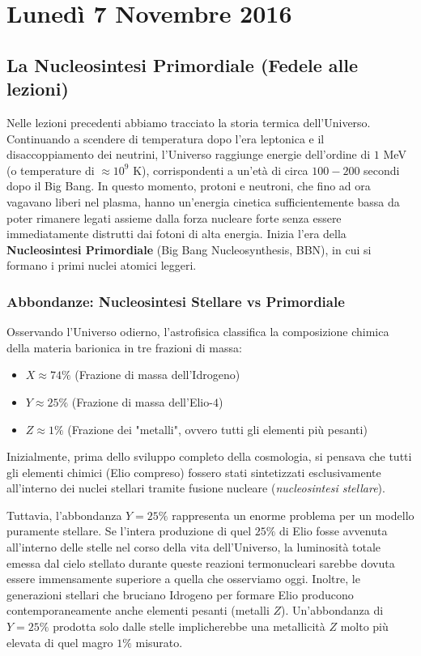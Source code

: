 \documentclass[11pt,a4paper]{report}
\begin{document}
\chapter{Lunedì 7 Novembre 2016}

\section{La Nucleosintesi Primordiale (Fedele alle lezioni)}

Nelle lezioni precedenti abbiamo tracciato la storia termica dell'Universo. Continuando a scendere di temperatura dopo l'era leptonica e il disaccoppiamento dei neutrini, l'Universo raggiunge energie dell'ordine di $1$ MeV (o temperature di $\approx 10^9$ K), corrispondenti a un'età di circa $100-200$ secondi dopo il Big Bang. 
In questo momento, protoni e neutroni, che fino ad ora vagavano liberi nel plasma, hanno un'energia cinetica sufficientemente bassa da poter rimanere legati assieme dalla forza nucleare forte senza essere immediatamente distrutti dai fotoni di alta energia. Inizia l'era della \textbf{Nucleosintesi Primordiale} (Big Bang Nucleosynthesis, BBN), in cui si formano i primi nuclei atomici leggeri.

\subsection{Abbondanze: Nucleosintesi Stellare vs Primordiale}
Osservando l'Universo odierno, l'astrofisica classifica la composizione chimica della materia barionica in tre frazioni di massa:
\begin{itemize}
    \item $X \approx 74\%$ (Frazione di massa dell'Idrogeno)
    \item $Y \approx 25\%$ (Frazione di massa dell'Elio-$4$)
    \item $Z \approx 1\%$ (Frazione dei "metalli", ovvero tutti gli elementi più pesanti)
\end{itemize}
Inizialmente, prima dello sviluppo completo della cosmologia, si pensava che tutti gli elementi chimici (Elio compreso) fossero stati sintetizzati esclusivamente all'interno dei nuclei stellari tramite fusione nucleare (\textit{nucleosintesi stellare}).

Tuttavia, l'abbondanza $Y = 25\%$ rappresenta un enorme problema per un modello puramente stellare. Se l'intera produzione di quel $25\%$ di Elio fosse avvenuta all'interno delle stelle nel corso della vita dell'Universo, la luminosità totale emessa dal cielo stellato durante queste reazioni termonucleari sarebbe dovuta essere immensamente superiore a quella che osserviamo oggi. Inoltre, le generazioni stellari che bruciano Idrogeno per formare Elio producono contemporaneamente anche elementi pesanti (metalli $Z$). Un'abbondanza di $Y = 25\%$ prodotta solo dalle stelle implicherebbe una metallicità $Z$ molto più elevata di quel magro $1\%$ misurato.
\end{document}
